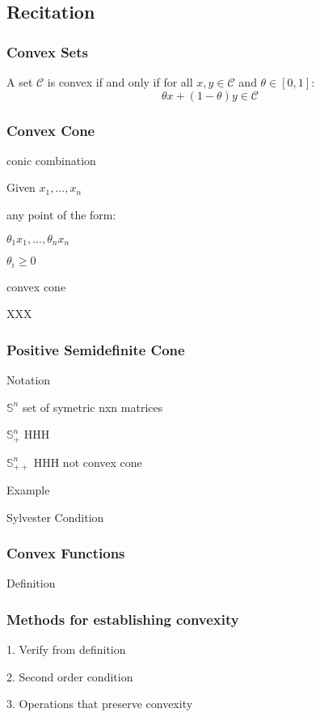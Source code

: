 \subsection{Recitation}

\subsubsection{Convex Sets}

A set $\mathcal{C}$ is convex if and only if for all
$x,y \in \mathcal{C}$ and $\theta \in [0,1]$:
$$\theta x + (1-\theta)y \in \mathcal{C}$$

\subsubsection{Convex Cone}

conic combination

Given $x_1,...,x_n$

any point of the form:

$\theta_1 x_1,...,\theta_n x_n$

$\theta_i \ge 0$

convex cone

XXX

\subsubsection{Positive Semidefinite Cone}

Notation

$\mathbb{S}^n$ set of symetric nxn matrices

$\mathbb{S}_+^n$ HHH

$\mathbb{S}_{++}^n$ HHH not convex cone

Example

Sylvester Condition

\subsubsection{Convex Functions}

Definition

\subsubsection{Methods for establishing convexity}

1. Verify from definition

2. Second order condition

3. Operations that preserve convexity

